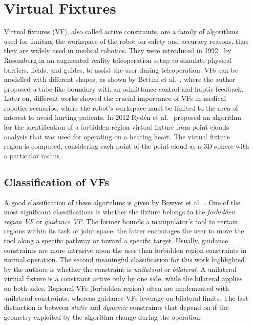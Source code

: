 \newpage
\chapter{Virtual Fixtures}

Virtual fixtures (VF), also called active constraints, are a family of algorithms used for limiting the workspace of the robot for safety and accuracy reasons, thus they are widely used in medical robotics. They were introduced in 1992~\cite{rosemberg1992use} by Rosemberg in an augmented reality teleoperation setup to simulate physical barriers, fields, and guides, to assist the user during teleoperation. 
VFs can be modelled with different shapes, as shown by Bettini et al.~\cite{bettini2004vision}, where the author proposed a tube-like boundary with an admittance control and haptic feedback. Later on, different works showed the crucial importance of VFs in medical robotics scenarios, where the robot's workspace must be limited to the area of interest to avoid hurting patients. In 2012 Rydén et al.~\cite{ryden2012forbidden} proposed an algorithm for the identification of a forbidden region virtual fixture from point clouds analysis that was used for operating on a beating heart. The virtual fixture region is computed, considering each point of the point cloud as a 3D sphere with a particular radius.

\section{Classification of VFs}

A good classification of these algorithms is given by Bowyer et al.~\cite{bowyer2014active}. One of the most significant classifications is whether the fixture belongs to the \textit{forbidden region VF} or \textit{guidance VF}. The former bounds a manipulator’s tool to certain regions within its task or joint space, the latter encourages the user to move the tool along a specific pathway or toward a specific target. Usually, guidance constraints are more intrusive upon the user than forbidden region constraints in normal operation. The second meaningful classification for this work highlighted by the authors is whether the constraint is \textit{unilateral} or \textit{bilateral}.
A unilateral virtual fixture is a constraint active only by one side, while the bilateral applies on both sides. 
Regional VFs (forbidden region) often are implemented with unilateral constraints, whereas guidance VFs leverage on bilateral limits.
The last distinction is between \textit{static} and \textit{dynamic} constraints that depend on if the geometry exploited by the algorithm change during the operation.


